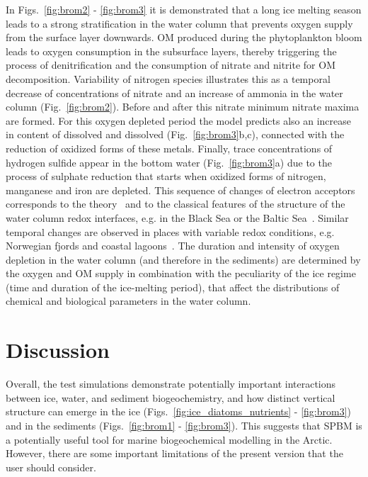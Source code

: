 \documentclass[gmd, manuscript]{copernicus}
\begin{document}
In Figs.~\ref{fig:brom2} - \ref{fig:brom3} it is demonstrated that a long ice melting season leads to a strong stratification in the water column that prevents oxygen supply from the surface layer downwards.
\textrm{OM} produced during the phytoplankton bloom leads to oxygen consumption in the subsurface layers, thereby triggering the process of denitrification and the consumption of nitrate and nitrite for \textrm{OM} decomposition.
Variability of nitrogen species illustrates this as a temporal decrease of concentrations of nitrate and an increase of ammonia in the water column (Fig.~\ref{fig:brom2}).
Before and after this nitrate minimum nitrate maxima are formed.
For this oxygen depleted period the model predicts also an increase in content of dissolved  and dissolved  (Fig.~\ref{fig:brom3}b,c), connected with the reduction of oxidized forms of these metals.
Finally, trace concentrations of hydrogen sulfide appear in the bottom water (Fig.~\ref{fig:brom3}a) due to the process of sulphate reduction that starts when oxidized forms of nitrogen, manganese and iron are depleted.
This sequence of changes of electron acceptors corresponds to the theory~\citep{Canfield2009} and to the classical features of the structure of the water column redox interfaces, e.g. in the Black Sea or the Baltic Sea~\citep{Murray1995, Yakushev2006, Jost2007}.
Similar temporal changes are observed in places with variable redox conditions, e.g. Norwegian fjords and coastal lagoons~\citep{Haraldsson1988, Riguad2013, Pakhomova2014}.
The duration and intensity of oxygen depletion in the water column (and therefore in the sediments) are determined by the oxygen and \textrm{OM} supply in combination with the peculiarity of the ice regime (time and duration of the ice-melting period), that affect the distributions of chemical and biological parameters in the water column.

\section{Discussion}
\label{subsec:discussion}

Overall, the test simulations demonstrate potentially important interactions between ice, water, and sediment biogeochemistry, and how distinct vertical structure can emerge in the ice (Figs.~\ref{fig:ice_diatoms_nutrients} - \ref{fig:brom3}) and in the sediments (Figs.~\ref{fig:brom1} - \ref{fig:brom3}).
This suggests that \textrm{SPBM} is a potentially useful tool for marine biogeochemical modelling in the Arctic.
However, there are some important limitations of the present version that the user should consider.
\end{document}
